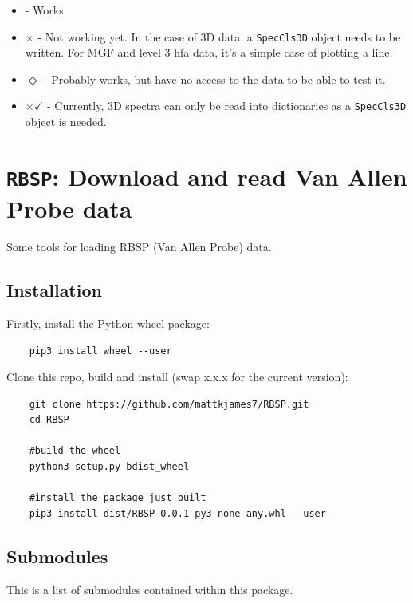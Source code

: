 	\begin{itemize}
	\item \checkmark - Works
	\item $\times$ - Not working yet. In the case of 3D data, a \texttt{SpecCls3D} object needs to be written. For MGF and level 3 hfa data, it's a simple case of plotting a line.
	\item $\Diamond$ - Probably works, but have no access to the data to be able to test it.
	\item $\times\checkmark$ - Currently, 3D spectra can only be read into dictionaries as a \texttt{SpecCls3D} object is needed.
	\end{itemize}


	\section{\texttt{RBSP}: Download and read Van Allen Probe data}
	
	Some tools for loading RBSP (Van Allen Probe) data. 
	
	\subsection{Installation}
	
	Firstly, install the Python wheel package:
	\begin{verbatim}
	pip3 install wheel --user
	\end{verbatim}
	
	Clone this repo, build and install (swap x.x.x for the current version):
	\begin{verbatim}
	git clone https://github.com/mattkjames7/RBSP.git
	cd RBSP
	
	#build the wheel
	python3 setup.py bdist_wheel
	
	#install the package just built
	pip3 install dist/RBSP-0.0.1-py3-none-any.whl --user
	\end{verbatim}
	
	\subsection{Submodules}
	
	This is a list of submodules contained within this package.
	
